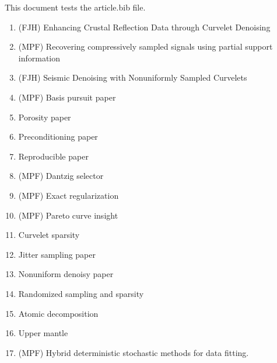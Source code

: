 \documentclass[11 pt]{amsart}
\begin{document}
This document tests the article.bib file. 

\begin{enumerate}

\item (FJH) Enhancing Crustal Reflection Data through Curvelet Denoising~\cite{kumar10TNPecr}

\item (MPF) Recovering compressively sampled signals using partial support information~\cite{mansour11TRrcs}

\item (FJH) Seismic Denoising with Nonuniformly Sampled Curvelets~\cite{hennenfent06CiSEsdn}


\item (MPF) Basis pursuit paper~\cite{Berg08SJOpt}

\item Porosity paper~\cite{bernabe04JGRpas}

\item Preconditioning paper~\cite{Erlangga07ETNAoam}

\item Reproducible paper~\cite{fomel07rce}

\item (MPF) Dantzig selector~\cite{friedlander07dtd}

\item (MPF) Exact regularization~\cite{friedlander07ero}

\item (MPF) Pareto curve insight~\cite{hennenfent08GEOnii}

\item Curvelet sparsity~\cite{hennenfent10nct}

\item Jitter sampling paper~\cite{hennenfent08GEOsdw}

\item Nonuniform denoisy paper~\cite{hennenfent06sdw}

\item Randomized sampling and sparsity~\cite{herrmann10rsg}

\item Atomic decomposition~\cite{herrmann05sdb}

\item Upper mantle~\cite{herrmann04ssa}

\item (MPF) Hybrid deterministic stochastic methods for data fitting.~\cite{friedlander11hybrid}


\end{enumerate}
\end{document}
